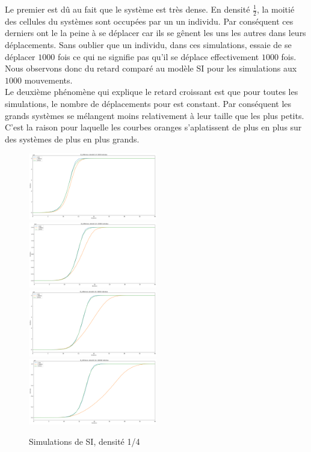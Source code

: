 Le premier est dû au fait que le système est très dense. En densité $\frac{1}{2}$, la moitié des cellules du systèmes sont occupées par un un individu. Par conséquent ces derniers ont le la peine à se déplacer car ils se gênent les uns les autres dans leurs déplacements. Sans oublier que un individu, dans ces simulations, essaie de se déplacer $1000$ fois ce qui ne signifie pas qu'il se déplace effectivement $1000$ fois. Nous observons donc du retard comparé au modèle SI pour les simulations aux $1000$ mouvements. \\

Le deuxième phénomène qui explique le retard croissant est que pour toutes les simulations, le nombre de déplacements pour est constant. Par conséquent les grands systèmes se mélangent moins relativement à leur taille que les plus petits. C'est la raison pour laquelle les courbes oranges s'aplatissent de plus en plus sur des systèmes de plus en plus grands.\\

\newpage

\begin{figure}
    \centering
    \captionsetup{justification=centering}
    \includegraphics[width=0.5\textwidth]{Images/SI_ref_4_5k.png}
    \includegraphics[width=0.5\textwidth]{Images/SI_ref_4_20k.png}
    \includegraphics[width=0.5\textwidth]{Images/SI_ref_4_50k.png}
    \includegraphics[width=0.5\textwidth]{Images/SI_ref_4_100k.png}
    \caption{Simulations de SI, densité 1/4}
\end{figure}

